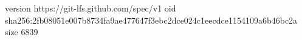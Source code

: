 version https://git-lfs.github.com/spec/v1
oid sha256:2fb08051e007b8734fa9ae477647f3ebc2dce024c1eecdce1154109a6b46bc2a
size 6839

